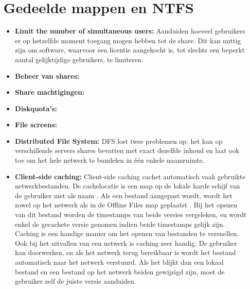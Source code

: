 	\section{Gedeelde mappen en NTFS}
	\begin{enumerate}
		 { 
			\begin{itemize}
                \item \textbf{Limit the number of simultaneous users:} Aanduiden hoeveel gebruikers er op hetzelfde moment toegang mogen hebben tot de share. Dit kan nuttig zijn om software, waarvoor een licentie aangekocht is, tot slechts een beperkt aantal gelijktijdige gebruikers, te limiteren. 

                \item \textbf{Beheer van shares:}
                \item \textbf{Share machtigingen:}
                \item \textbf{Diskquota's:}
                \item \textbf{File screens:}
                \item \textbf{Distributed File System:} DFS lost twee problemen op: het kan op verschillende servers shares bevatten met exact dezelfde inhoud en laat ook toe om het hele netwerk te bundelen in één enkele naamruimte.
                \item \textbf{Client-side caching:} Client-side caching cachet automatisch vaak gebruikte netwerkbestanden. De cachelocatie is een map op de lokale harde schijf van de gebruiker met als naam . Als een bestand aangepast wordt, wordt het zowel op het netwerk als in de Offline Files map geplaatst . Bij het openen van dit bestand worden de timestamps van beide versies vergeleken, en wordt enkel de gecachete versie genomen indien beide timestamps gelijk zijn. Caching is een handige manier om het openen van bestanden te versnellen. Ook bij het uitvallen van een netwerk is caching zeer handig. De gebruiker kan doorwerken, en als het netwerk terug bereikbaar is wordt het bestand automatisch naar het netwerk verstuurd. Als het blijkt dan een lokaal bestand en een bestand op het netwerk beiden gewijzigd zijn, moet de gebruiker zelf de juiste versie aanduiden.
                

\end{itemize}}
\end{enumerate}

